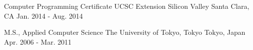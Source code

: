 

\begin{cventries}

  \cventry
    {Computer Programming Certificate} %
    {UCSC Extension Silicon Valley} %
    {Santa Clara, CA} %
    {Jan. 2014 - Aug. 2014} %
    {
    }

  \cventry
    {M.S., Applied Computer Science} %
    {The University of Tokyo, Tokyo} %
    {Tokyo, Japan} %
    {Apr. 2006 - Mar. 2011} %
    {
    }

\end{cventries}
